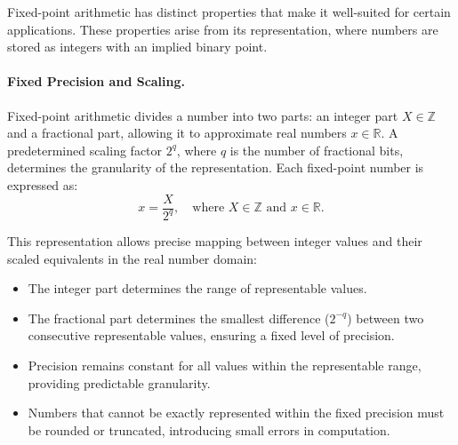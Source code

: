 Fixed-point arithmetic has distinct properties that make it well-suited for certain applications. These properties arise from its representation, where numbers are stored as integers with an implied binary point. 

\paragraph{Fixed Precision and Scaling.}

Fixed-point arithmetic divides a number into two parts: an integer part \( X \in \mathbb{Z} \) and a fractional part, allowing it to approximate real numbers \( x \in \mathbb{R} \). A predetermined scaling factor \( 2^q \), where \( q \) is the number of fractional bits, determines the granularity of the representation. Each fixed-point number is expressed as:
\[
x = \frac{X}{2^q}, \quad \text{where } X \in \mathbb{Z} \text{ and } x \in \mathbb{R}.
\]

This representation allows precise mapping between integer values and their scaled equivalents in the real number domain:
\begin{itemize}
    \item The integer part determines the range of representable values.
    \item The fractional part determines the smallest difference (\( 2^{-q} \)) between two consecutive representable values, ensuring a fixed level of precision.

\end{itemize}

\begin{itemize}
    \item Precision remains constant for all values within the representable range, providing predictable granularity.
    \item Numbers that cannot be exactly represented within the fixed precision must be rounded or truncated, introducing small errors in computation.
\end{itemize}



